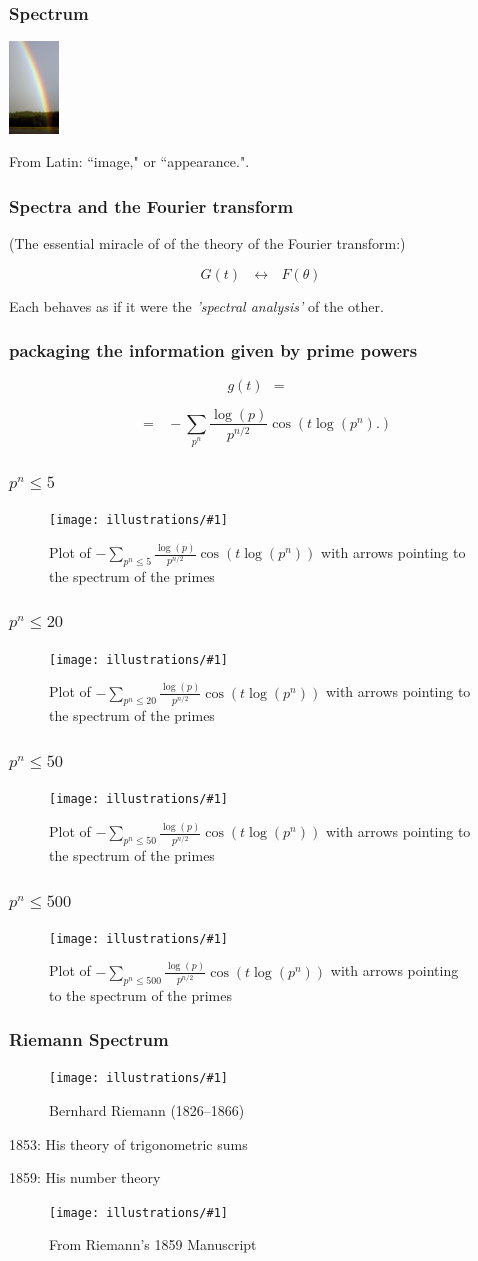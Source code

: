 \documentclass{beamer}
\newcommand{\ill}[3]{%
   \begin{figure}[H]%
   \vspace{-2ex}
   \centering%
   \texttt{[image: illustrations/\#1]}%
   \caption{#3}%
   \vspace{-2ex}
    \end{figure}}
\begin{document}
\begin{frame}\frametitle{\bf Spectrum}

  \hskip100pt   \includegraphics[width=0.1\textwidth]{illustrations/rainbow}

\vskip10pt
 {\Huge From Latin:\vskip10pt ``image," or ``appearance.".}\end{frame}
  \begin{frame}\frametitle{\bf Spectra and the Fourier transform}

(The essential miracle of of the theory of the Fourier transform:)
\vskip10pt
{\Huge $$  G(t) \ \ \ \leftrightarrow \ \ \ F(\theta)$$

\vskip10pt

Each behaves as if it were  the \vskip5pt {\it 'spectral analysis'} of the other.}\end{frame}
\begin{frame}\frametitle{\bf packaging the information given by prime powers}
{\Huge $$ g(t)\ \ =\ \ $$

\vskip10pt

$$\ \ \ = \ \ \ -\sum_{p^n}{\frac{\log(p)}{p^{n/2}}}\cos(t\log(p^n).)
$$}\end{frame}
\begin{frame}\frametitle{\bf $p^n \leq 5$}
{\Huge
\ill{phihat_even-5}{1}{Plot of $-\sum_{p^n\leq 5}{\frac{\log(p)}{p^{n/2}}}\cos(t\log(p^n))$ with
arrows pointing to the spectrum of the primes\label{fig:pnsum5}}
}\end{frame}
\begin{frame}\frametitle{\bf $p^n \leq 20$}
{\Huge
\ill{phihat_even-20}{1}{Plot of $-\sum_{p^n\leq 20}{\frac{\log(p)}{p^{n/2}}}\cos(t\log(p^n))$ with arrows pointing to the spectrum of the primes}}\end{frame}
\begin{frame}\frametitle{\bf $p^n \leq 50$}
{\Huge

\ill{phihat_even-50}{1}{Plot of $-\sum_{p^n\leq 50}{\frac{\log(p)}{p^{n/2}}}\cos(t\log(p^n))$ with arrows pointing to the spectrum of the primes}}\end{frame}
\begin{frame}\frametitle{\bf $p^n \leq 500$}
{\Huge   \ill{phihat_even-500}{1}{Plot of $-\sum_{p^n\leq
      500}{\frac{\log(p)}{p^{n/2}}}\cos(t\log(p^n))$ with arrows
    pointing to the spectrum of the primes\label{fig:pnsum500}}}\end{frame}

\begin{frame}\frametitle{\bf Riemann Spectrum}


\ill{riemann}{.2}{Bernhard Riemann (1826--1866)}

\centerline{1853: His theory of trigonometric sums}
\centerline{1859: His number theory}

\ill{riemann_zoom}{1}{From Riemann's 1859 Manuscript\label{fig:riemamn}}


  \end{frame}
\end{document}
